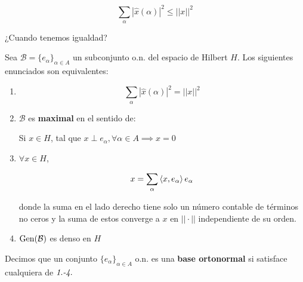 \[\sum_\alpha |\hat x(\alpha)|^2\leq ||x||^2\]

¿Cuando tenemos igualdad?

\begin{ftheorem}
    Sea $\mathcal{B}=\{e_\alpha\}_{\alpha\in A}$ un subconjunto o.n. del espacio de Hilbert $H$. Los siguientes enunciados son equivalentes:

    \begin{enumerate}
        \item \[\sum_\alpha |\hat x(\alpha)|^2=||x||^2\]
        \item $\mathcal{B}$ es \textbf{maximal} en el sentido de:
        
        Si $x\in H$, tal que $x\perp e_\alpha,\forall \alpha\in A\implies x=0$

        \item $\forall x\in H$, 
        
        \[x=\sum_{\alpha}\left\langle x,e_\alpha\right\rangle e_\alpha\]

        donde la suma en el lado derecho tiene solo un número contable de términos no ceros y la suma de estos converge a $x$ en $||\cdot||$ independiente de su orden.

        \item $\operatorname{Gen}(\mathcal{B})$ es denso en $H$
    \end{enumerate}
\end{ftheorem}

\begin{fdefinition}
    Decimos que un conjunto $\{e_\alpha\}_{\alpha\in A}$ o.n. es una \textbf{base ortonormal} si satisface cualquiera de $\emph{1.-4.}$
\end{fdefinition}


